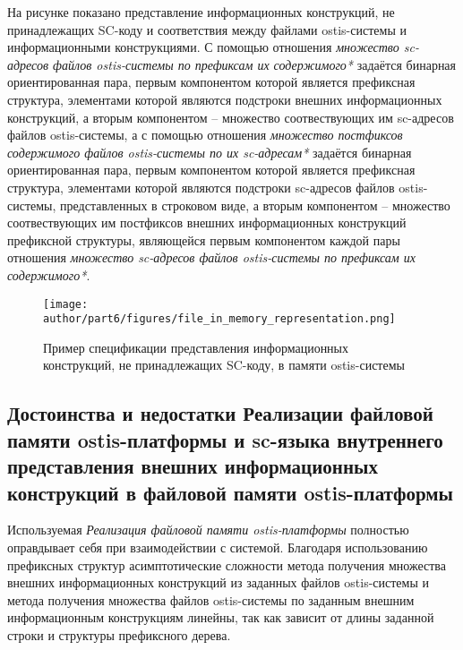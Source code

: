 На рисунке  показано представление информационных конструкций, не принадлежащих SC-коду и соответствия между файлами ostis-системы и информационными конструкциями. С помощью отношения \textit{множество sc-адресов файлов ostis-системы по префиксам их содержимого*} задаётся бинарная ориентированная пара, первым компонентом которой является префиксная структура, элементами которой являются подстроки внешних информационных конструкций, а вторым компонентом -- множество соотвествующих им sc-адресов файлов ostis-системы, а с помощью отношения \textit{множество постфиксов содержимого файлов ostis-системы по их sc-адресам*} задаётся бинарная ориентированная пара, первым компонентом которой является префиксная структура, элементами которой являются подстроки sc-адресов файлов ostis-системы, представленных в строковом виде, а вторым компонентом -- множество соотвествующих им постфиксов внешних информационных конструкций префиксной структуры, являющейся первым компонентом каждой пары отношения \textit{множество sc-адресов файлов ostis-системы по префиксам их содержимого*}.

\begin{figure*}[htbp]
	\center
	\texttt{[image: author/part6/figures/file\_in\_memory\_representation.png]}
	\caption{Пример спецификации представления информационных конструкций, не принадлежащих SC-коду, в памяти ostis-системы}
	\label{fig:file_in_memory_representation}
\end{figure*}

\subsection{Достоинства и недостатки Реализации файловой памяти ostis-платформы и sc-языка внутреннего представления внешних информационных конструкций в файловой памяти ostis-платформы}
\label{sec_soft_platform_scfin_code_problems}

Используемая \textit{Реализация файловой памяти ostis-платформы} полностью оправдывает себя при взаимодействии с системой. Благодаря использованию префиксных структур асимптотические сложности метода получения множества внешних информационных конструкций из заданных файлов ostis-системы и метода получения множества файлов ostis-системы по заданным внешним информационным конструкциям линейны, так как зависит от длины заданной строки и структуры префиксного дерева.

